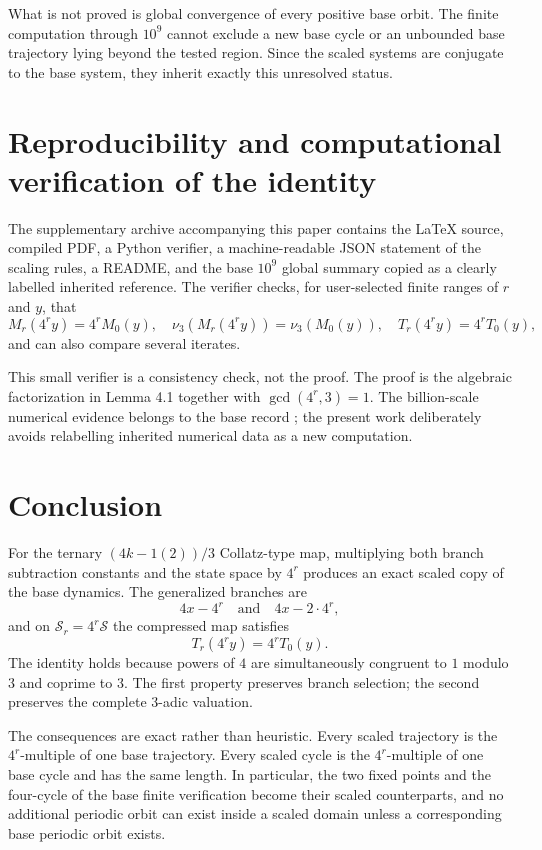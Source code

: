\documentclass[11pt]{article}
\newcommand{\vthree}{\nu_3}
\newcommand{\Sbase}{\mathcal S}
\newcommand{\Sr}{\mathcal S_r}
\begin{document}
What is not proved is global convergence of every positive base orbit. The finite computation through $10^9$ cannot exclude a new base cycle or an unbounded base trajectory lying beyond the tested region. Since the scaled systems are conjugate to the base system, they inherit exactly this unresolved status.

\section{Reproducibility and computational verification of the identity}
The supplementary archive accompanying this paper contains the LaTeX source, compiled PDF, a Python verifier, a machine-readable JSON statement of the scaling rules, a README, and the base $10^9$ global summary copied as a clearly labelled inherited reference. The verifier checks, for user-selected finite ranges of $r$ and $y$, that
\[
M_r(4^ry)=4^rM_0(y),
\quad
\vthree(M_r(4^ry))=\vthree(M_0(y)),
\quad
T_r(4^ry)=4^rT_0(y),
\]
and can also compare several iterates.

This small verifier is a consistency check, not the proof. The proof is the algebraic factorization in Lemma 4.1 together with $\gcd(4^r,3)=1$. The billion-scale numerical evidence belongs to the base record \cite{BanazadehBase}; the present work deliberately avoids relabelling inherited numerical data as a new computation.

\section{Conclusion}
For the ternary $(4k-1(2))/3$ Collatz-type map, multiplying both branch subtraction constants and the state space by $4^r$ produces an exact scaled copy of the base dynamics. The generalized branches are
\[
4x-4^r\quad\text{and}\quad4x-2\cdot4^r,
\]
and on $\Sr=4^r\Sbase$ the compressed map satisfies
\[
\boxed{T_r(4^ry)=4^rT_0(y).}
\]
The identity holds because powers of $4$ are simultaneously congruent to $1$ modulo $3$ and coprime to $3$. The first property preserves branch selection; the second preserves the complete 3-adic valuation.

The consequences are exact rather than heuristic. Every scaled trajectory is the $4^r$-multiple of one base trajectory. Every scaled cycle is the $4^r$-multiple of one base cycle and has the same length. In particular, the two fixed points and the four-cycle of the base finite verification become their scaled counterparts, and no additional periodic orbit can exist inside a scaled domain unless a corresponding base periodic orbit exists.
\end{document}

